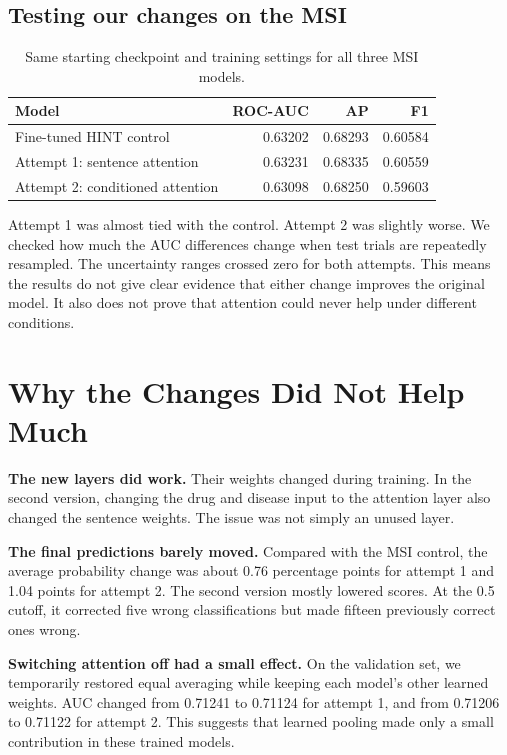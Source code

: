\documentclass[10pt,letterpaper]{article}
\begin{document}
\subsection{Testing our changes on the MSI}
\begin{table}[H]
\centering
\caption{Same starting checkpoint and training settings for all three MSI models.}
\begin{tabular}{lrrr}\toprule
Model & ROC-AUC & AP & F1\\\midrule
Fine-tuned HINT control & 0.63202 & 0.68293 & 0.60584\\
Attempt 1: sentence attention & 0.63231 & 0.68335 & 0.60559\\
Attempt 2: conditioned attention & 0.63098 & 0.68250 & 0.59603\\\bottomrule
\end{tabular}
\end{table}

Attempt 1 was almost tied with the control. Attempt 2 was slightly worse. We checked how much the AUC differences change when test trials are repeatedly resampled. The uncertainty ranges crossed zero for both attempts. This means the results do not give clear evidence that either change improves the original model. It also does not prove that attention could never help under different conditions.

\section{Why the Changes Did Not Help Much}
\textbf{The new layers did work.} Their weights changed during training. In the second version, changing the drug and disease input to the attention layer also changed the sentence weights. The issue was not simply an unused layer.

\textbf{The final predictions barely moved.} Compared with the MSI control, the average probability change was about 0.76 percentage points for attempt 1 and 1.04 points for attempt 2. The second version mostly lowered scores. At the 0.5 cutoff, it corrected five wrong classifications but made fifteen previously correct ones wrong.

\textbf{Switching attention off had a small effect.} On the validation set, we temporarily restored equal averaging while keeping each model's other learned weights. AUC changed from 0.71241 to 0.71124 for attempt 1, and from 0.71206 to 0.71122 for attempt 2. This suggests that learned pooling made only a small contribution in these trained models.
\end{document}
